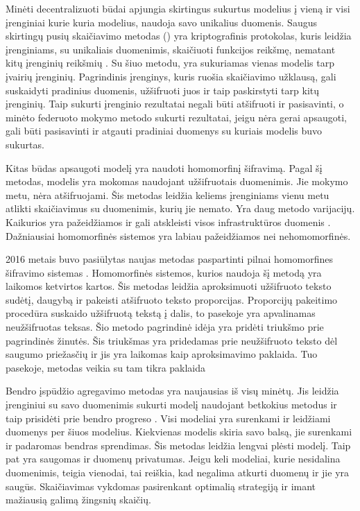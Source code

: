 \documentclass{VUMIFInfBakalaurinis}
\begin{document}
\par Minėti decentralizuoti būdai apjungia skirtingus sukurtus modelius į vieną ir visi įrenginiai kurie kuria modelius, naudoja savo unikalius duomenis. Saugus skirtingų pusių skaičiavimo metodas () yra kriptografinis protokolas, kuris leidžia įrenginiams, su unikaliais duomenimis, skaičiuoti funkcijos reikšmę, nematant kitų įrenginių reikšmių \cite{6}. Su šiuo metodu, yra sukuriamas vienas modelis tarp įvairių įrenginių. Pagrindinis įrenginys, kuris ruošia skaičiavimo užklausą, gali suskaidyti pradinius duomenis, užšifruoti juos ir taip paskirstyti tarp kitų įrenginių. Taip sukurti įrenginio rezultatai negali būti atšifruoti ir pasisavinti, o minėto federuoto mokymo metodo sukurti rezultatai, jeigu nėra gerai apsaugoti, gali būti pasisavinti ir atgauti pradiniai duomenys su kuriais modelis buvo sukurtas.
\par  Kitas būdas apsaugoti modelį yra naudoti homomorfinį šifravimą. Pagal šį metodas, modelis yra mokomas naudojant užšifruotais duomenimis. Jie mokymo metu, nėra atšifruojami. Šis metodas leidžia keliems įrenginiams vienu metu atlikti skaičiavimus su duomenimis, kurių jie nemato. Yra daug metodo varijacijų. Kaikurios yra pažeidžiamos ir gali atskleisti visos infrastruktūros duomenis \cite{7}. Dažniausiai homomorfinės sistemos yra labiau pažeidžiamos nei nehomomorfinės.
\par 2016 metais buvo pasiūlytas naujas metodas paspartinti pilnai homomorfines šifravimo sistemas \cite{8}. Homomorfinės sistemos, kurios naudoja šį metodą yra laikomos ketvirtos kartos. Šis metodas leidžia aproksimuoti užšifruoto teksto sudėtį, daugybą ir pakeisti atšifruoto teksto proporcijas. 
Proporcijų pakeitimo procedūra suskaido užšifruotą tekstą į dalis, to pasekoje yra apvalinamas neužšifruotas teksas. Šio metodo pagrindinė idėja yra pridėti triukšmo prie pagrindinės žinutės. Šis triukšmas yra pridedamas prie neužšifruoto teksto dėl saugumo priežasčių ir jis yra laikomas kaip aproksimavimo paklaida. Tuo pasekoje, metodas veikia su tam tikra paklaida
\par Bendro įspūdžio agregavimo metodas yra naujausias iš visų minėtų. Jis leidžia įrenginiui su savo duomenimis sukurti modelį naudojant betkokius metodus ir taip prisidėti prie bendro progreso \cite{6}. Visi modeliai yra surenkami ir leidžiami duomenys per šiuos modelius. Kiekvienas modelis skiria savo balsą, jie surenkami ir padaromas bendras sprendimas. Šis metodas leidžia lengvai plėsti modelį. Taip pat yra saugomas ir duomenų privatumas. Jeigu keli modeliai, kurie nesidalina duomenimis, teigia vienodai, tai reiškia, kad negalima atkurti duomenų ir jie yra saugūs. Skaičiavimas vykdomas pasirenkant optimalią strategiją ir imant mažiausią galimą žingsnių skaičių.
\end{document}
